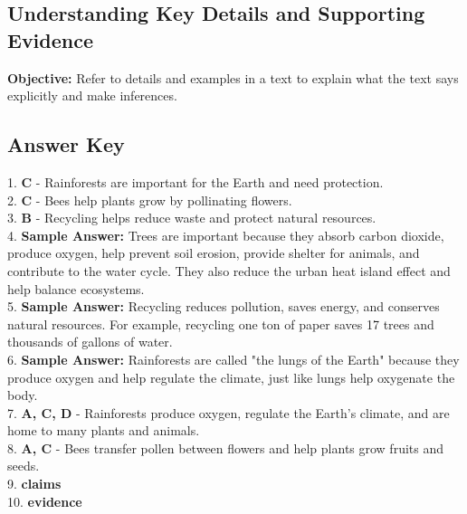 \documentclass[12pt]{article}
\begin{document}
\subsection*{Understanding Key Details and Supporting Evidence}
\onehalfspacing

\begin{tcolorbox}[colframe=black!40, colback=gray!0, title=Learning Objective]
\textbf{Objective:} Refer to details and examples in a text to explain what the text says explicitly and make inferences.
\end{tcolorbox}


\subsection*{Answer Key}

1. \textbf{C} - Rainforests are important for the Earth and need protection.\\
2. \textbf{C} - Bees help plants grow by pollinating flowers.\\
3. \textbf{B} - Recycling helps reduce waste and protect natural resources.\\
4. \textbf{Sample Answer:} Trees are important because they absorb carbon dioxide, produce oxygen, help prevent soil erosion, provide shelter for animals, and contribute to the water cycle. They also reduce the urban heat island effect and help balance ecosystems.\\
5. \textbf{Sample Answer:} Recycling reduces pollution, saves energy, and conserves natural resources. For example, recycling one ton of paper saves 17 trees and thousands of gallons of water.\\
6. \textbf{Sample Answer:} Rainforests are called "the lungs of the Earth" because they produce oxygen and help regulate the climate, just like lungs help oxygenate the body.\\
7. \textbf{A, C, D} - Rainforests produce oxygen, regulate the Earth’s climate, and are home to many plants and animals.\\
8. \textbf{A, C} - Bees transfer pollen between flowers and help plants grow fruits and seeds.\\
9. \textbf{claims} \\
10. \textbf{evidence} \\
\end{document}

